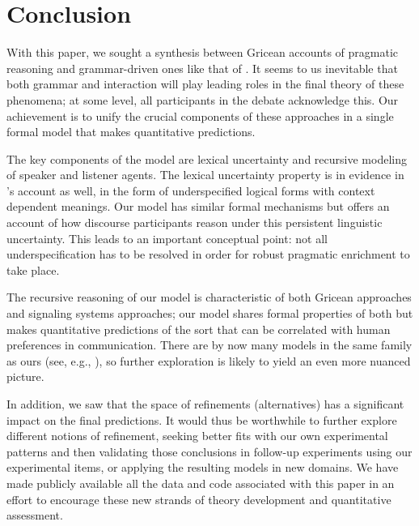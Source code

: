 \documentclass[leqno,12pt]{article}
\begin{document}

\section{Conclusion}\label{sec:conclusion}


With this paper, we sought a synthesis between Gricean accounts of
pragmatic reasoning and grammar-driven ones like that of
\citet{ChierchiaFoxSpector08}. It seems to us inevitable that both
grammar and interaction will play leading roles in the final theory of
these phenomena; at some level, all participants in the debate
acknowledge this. Our achievement is to unify the crucial components
of these approaches in a single formal model that makes quantitative
predictions.

The key components of the model are lexical uncertainty and recursive
modeling of speaker and listener agents. The lexical uncertainty
property is in evidence in \citeauthor{ChierchiaFoxSpector08}'s
account as well, in the form of underspecified logical forms with
context dependent meanings. Our model has similar formal mechanisms
but offers an account of how discourse participants reason under this
persistent linguistic uncertainty. This leads to an important
conceptual point: not all underspecification has to be resolved in
order for robust pragmatic enrichment to take place.

The recursive reasoning of our model is characteristic of both Gricean
approaches and signaling systems approaches; our model shares formal
properties of both but makes quantitative predictions of the sort that
can be correlated with human preferences in communication. There are
by now many models in the same family as ours (see, e.g.,
\citealt{CamererHo:2004,Jaeger:2011,Smith:Goodman:Frank:2013,Kao-etal:2014}),
so further exploration is likely to yield an even more nuanced
picture.

In addition, we saw that the space of refinements (alternatives) has a
significant impact on the final predictions. It would thus be
worthwhile to further explore different notions of refinement, seeking
better fits with our own experimental patterns and then validating
those conclusions in follow-up experiments using our experimental
items, or applying the resulting models in new domains.  We have made
publicly available all the data and code associated with this paper in
an effort to encourage these new strands of theory development and
quantitative assessment.



\small

\setlength{\bibsep}{0pt}

\end{document}
